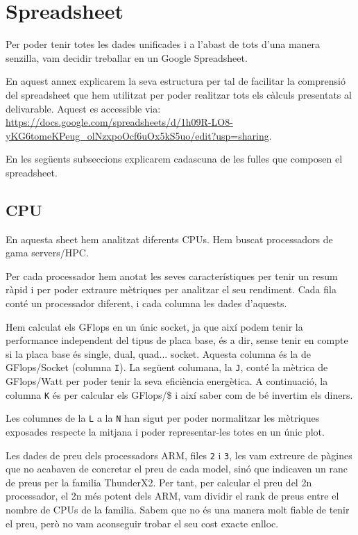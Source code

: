 \appendix
\section{Spreadsheet} \label{sec:annex}
Per poder tenir totes les dades unificades i a l'abast de tots d'una manera senzilla, vam decidir treballar en un Google Spreadsheet. 

En aquest annex explicarem la seva estructura per tal de facilitar la comprensió del spreadsheet que hem utilitzat per poder realitzar tots els càlculs presentats al delivarable. Aquest es accessible via: \url{https://docs.google.com/spreadsheets/d/1h09R-LO8-yKG6tomeKPeug\_olNzxpoOcf6uOx5kS5uo/edit?usp=sharing}.

En les següents subseccions explicarem cadascuna de les fulles que composen el spreadsheet.

\subsection{CPU}
En aquesta sheet hem analitzat diferents CPUs. Hem buscat processadors de gama servers/HPC. 

Per cada processador hem anotat les seves característiques per tenir un resum ràpid i per poder extraure mètriques per analitzar el seu rendiment. Cada fila conté un processador diferent, i cada columna les dades d'aquests.

Hem calculat els GFlops en un únic socket, ja que així podem tenir la performance independent del tipus de placa base, és a dir, sense tenir en compte si la placa base és single, dual, quad... socket. 
Aquesta columna és la de GFlops/Socket (columna \texttt{I}). La següent columana, la \texttt{J}, conté la mètrica de GFlops/Watt per poder tenir la seva eficiència energètica. A continuació, la columna \texttt{K} és per calcular els GFlops/\$ i així saber com de bé invertim els diners.

Les columnes de la \texttt{L} a la \texttt{N} han sigut per poder normalitzar les mètriques exposades respecte la mitjana i poder representar-les totes en un únic plot.

Les dades de preu dels processadors ARM, files \texttt{2} i \texttt{3}, les vam extreure de pàgines que no acabaven de concretar el preu de cada model, sinó que indicaven un ranc de preus per la familia ThunderX2. Per tant, per calcular el preu del 2n processador, el 2n més potent dels ARM, vam dividir el rank de preus entre el nombre de CPUs de la familia. Sabem que no és una manera molt fiable de tenir el preu, però no vam aconseguir trobar el seu cost exacte enlloc.

